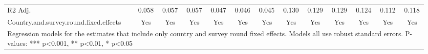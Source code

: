 \begin{table}[H]
\begin{tabular}[t]{lcccccccccccc}
R2 Adj. & \num{0.058} & \num{0.057} & \num{0.057} & \num{0.047} & \num{0.046} & \num{0.045} & \num{0.130} & \num{0.129} & \num{0.129} & \num{0.124} & \num{0.112} & \num{0.118}\\
Country.and.survey.round.fixed.effects & Yes & Yes & Yes & Yes & Yes & Yes & Yes & Yes & Yes & Yes & Yes & Yes\\
\bottomrule
\multicolumn{13}{l}{\rule{0pt}{1em}Regression models for the estimates that include only country and survey round fixed effects. Models all use robust standard errors. P-values: *** p<0.001, ** p<0.01, * p<0.05}\\
\end{tabular}
\end{table}
